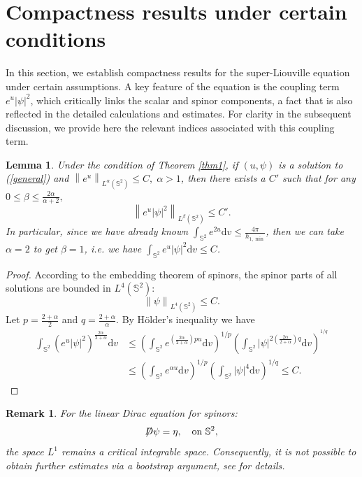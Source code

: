 \documentclass[a4paper, 12pt]{article}
\newtheorem{lemma}[theorem]{Lemma}
\newtheorem{remark}[theorem]{Remark}
\def\slashiii#1{\setbox0=\hbox{$#1$}#1\hskip-\wd0\hbox to\wd0{\hss\sl/\/\hss}}
\begin{document}
\section{Compactness results under certain conditions}
In this section, we establish compactness results for the super-Liouville equation under certain assumptions. A key feature of the equation is the coupling term ${e^u}{\left| \psi \right|^2}$, which critically links the scalar and spinor components, a fact that is also reflected in the detailed calculations and estimates. For clarity in the subsequent discussion, we provide here the relevant indices associated with this coupling term.
\begin{lemma}\label{holder}
	Under the condition of Theorem \ref{thm1}, if $\left( u,\psi \right) $ is a solution to (\ref{general}) and ${\left\| {{e^{u}}} \right\|_{{L^\alpha }\left( {{\mathbb{S}^2}} \right)}} \leq C,\;\alpha  > 1$, then there exists a $C'$ such that for any $0\leq \beta  \leq \frac{{2\alpha }}{{ \alpha+2 }},$
	\[
	{\left\| {{e^{u}}{{\left| \psi  \right|}^2}} \right\|_{{L^\beta }\left( {{\mathbb{S}^2}} \right)}} \leq C'.
	\]
	In particular, since we have already known \( \int_{{\mathbb{S}^2}} {{e^{2u}}} \mathrm{d}v \leq \frac{4\pi}{{{h_{1,\min }}}} \), then we can take $\alpha=2$ to get $\beta=1$, i.e. we have \( \int_{{\mathbb{S}^2}} {{e^{u}}{{\left| \psi  \right|}^2}}{\mathrm{d}v}  \leq C \).
\end{lemma}
\begin{proof}
	According to the embedding theorem of spinors, the spinor parts of all solutions are bounded in $L ^ 4(\mathbb{S}^2) $:\[{\left\| \psi  \right\|_{{L^4({\mathbb{S}^2})}}} \leq C.\]
	Let $p = \frac{{2 + \alpha }}{2}$ and $q = \frac{{2 + \alpha }}{\alpha }$. By H{\"o}lder's inequality we have
	\[\begin{aligned}
		\int_{{\mathbb{S}^2}} {{{\left( {{e^{u}}{{\left| \psi  \right|}^2}} \right)}^{\frac{{2\alpha }}{{2 + \alpha }}}}}{\text{d}{v}}  &\leq {\left( {\int_{{\mathbb{S}^2}} {{e^{\left( {\frac{{2\alpha }}{{2 + \alpha }}} \right)pu}}} }{\text{d}{v}} \right)^{1/p}}{\left( {\int_{{\mathbb{S}^2}} {{{\left| \psi  \right|}^{2\left( {\frac{{2\alpha }}{{2 + \alpha }}}\right)q}}} {\text{d}{v}}} \right)^{^{1/q}}}  \\
		&\leq {\left( {\int_{{\mathbb{S}^2}} {{e^{\alpha u}}} } {\text{d}{v}}\right)^{1/p}}{\left( {\int_{{\mathbb{S}^2}} {{{\left| \psi  \right|}^4}} } {\text{d}{v}}\right)^{1/q}} \leq C  .
	\end{aligned} \]
\end{proof}
\begin{remark}
	For the linear Dirac equation for spinors:
	\[
	\slashiii{D}\psi = \eta, \quad \text{on } \mathbb{S}^2,
	\]
	the space \(L^1\) remains a critical integrable space. Consequently, it is not possible to obtain further estimates via a bootstrap argument, see \cite[Lemma3.2.2, Theorem 3.2.1]{ammann2003variational} for details.
\end{remark}
\end{document}
